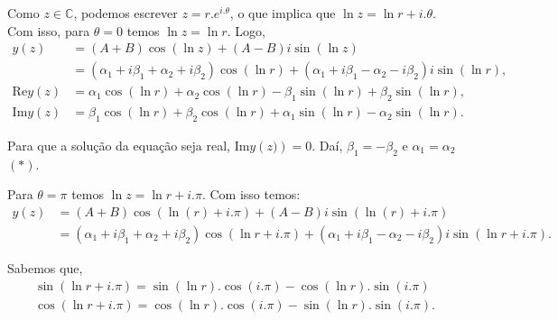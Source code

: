 \documentclass[a4paper,12pt, leqno, answers]{exam}
\begin{document}
\begin{questions}
\begin{solution}
        Como $z \in \mathbb{C}$, podemos escrever $z = r.e^{i.\theta}$, o que implica que $\ln z = \ln r + i.\theta$. Com isso, para $\theta = 0$ temos $\ln z = \ln r$. Logo,
        \begin{align*}
            y(z) &= \left( A + B \right) \cos\left( \ln z \right) + \left( A - B \right) i \sin \left( \ln z \right) \\
            &= \left( \alpha_1 + i \beta_1 + \alpha_2 + i\beta_2 \right) \cos \left( \ln r \right) + \left( \alpha_1 + i \beta_1 - \alpha_2 - i\beta_2 \right) i \sin\left( \ln r \right), \\
            \text{Re} y\left( z \right) &= \alpha_1 \cos\left( \ln r \right) + \alpha_2 \cos\left( \ln r \right) - \beta_1 \sin\left( \ln r \right) + \beta_2 \sin\left( \ln r \right), \\
            \text{Im} y\left( z \right) &= \beta_1 \cos\left( \ln r \right) + \beta_2 \cos\left( \ln r \right) + \alpha_1 \sin\left( \ln r \right) - \alpha_2 \sin\left( \ln r \right).
        \end{align*}
        
        Para que a solu\c{c}\~{a}o da equa\c{c}\~{a}o seja real, $\text{Im} y\left( z) \right) = 0$. Da\'{i}, $\beta_1 = -\beta_2$ e $\alpha_1 = \alpha_2$ $\left(*\right)$.

        Para $\theta = \pi$ temos $\ln z = \ln r + i.\pi$. Com isso temos:
        \begin{align*}
            y\left( z \right) &= \left( A + B \right) \cos\left( \ln\left( r \right) + i.\pi\right) + \left( A - B \right) i \sin\left( \ln\left( r \right) +i.\pi\right) \\
            & = \left( \alpha_1 + i \beta_1 + \alpha_2 + i\beta_2 \right) \cos \left( \ln r + i.\pi \right) + \left( \alpha_1 + i \beta_1 - \alpha_2 - i\beta_2 \right) i \sin\left( \ln r + i.\pi \right).
        \end{align*}
        
       Sabemos que,   
       \begin{align*}
	\sin\left(\ln r + i.\pi\right) = \sin\left(\ln r\right).\cos\left(i.\pi\right) - \cos\left(\ln r\right).\sin\left(i.\pi\right)\\
       	\cos\left(\ln r + i.\pi\right) = \cos\left(\ln r\right).\cos\left(i.\pi\right) - \sin\left(\ln r\right).\sin\left(i.\pi\right).
       \end{align*}
       

\end{solution}
\end{questions}
\end{document}
